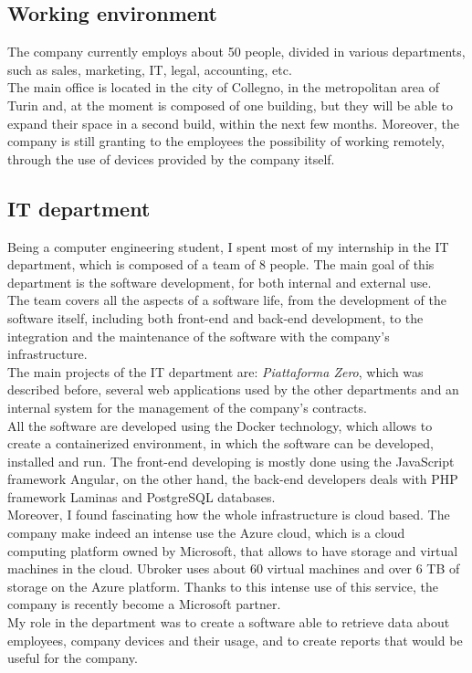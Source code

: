 \documentclass[12pt, a4paper, oneside]{article}
\begin{document}
\subsection{Working environment}
The company currently employs about 50 people, divided in various departments, such as sales, marketing, IT, legal, accounting, etc.\\
The main office is located in the city of Collegno, in the metropolitan area of Turin and, at the moment is composed of one building, but they will be able to expand their space in a second build, within the next
few months. Moreover, the company is still granting to the employees the possibility of working remotely, through the use of devices provided by the company itself.

\subsection{IT department}
Being a computer engineering student, I spent most of my internship in the IT department, which is composed of a team of 8 people. The main goal of this department is the software development, 
for both internal and external use.\\ 
The team covers all the aspects of a software life, from the development of the software itself, including both front-end and back-end development, to the integration and the maintenance of the software with the company's 
infrastructure.\\
The main projects of the IT department are: \emph{Piattaforma Zero}, which was described before, several web applications used by the other departments and an internal system for the management of the company's contracts.\\
All the software are developed using the Docker technology, which allows to create a containerized environment, in which the software can be developed, installed and run. The front-end developing is mostly done
using the JavaScript framework Angular, on the other hand, the back-end developers deals with PHP framework Laminas and PostgreSQL databases.\\
Moreover, I found fascinating how the whole infrastructure is cloud based. The company make indeed an intense use the Azure cloud, which is a cloud computing platform owned by Microsoft, that allows
to have storage and virtual machines in the cloud. Ubroker uses about 60 virtual machines and over 6 TB of storage on the Azure platform. Thanks to this intense use of this service, the company is recently
become a Microsoft partner.\\
My role in the department was to create a software able to retrieve data about employees, company devices and their usage, and to create reports that would be useful for the company.
\end{document}
